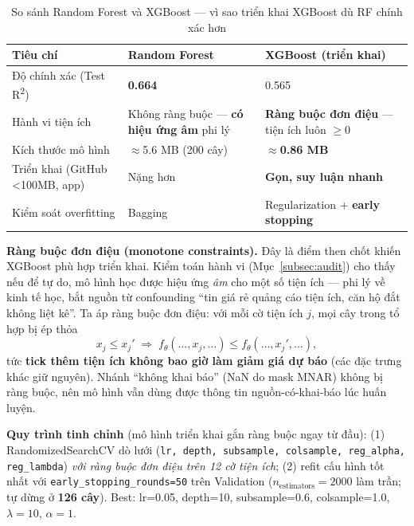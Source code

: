 \begin{table}[H]
  \centering
  \caption{So sánh Random Forest và XGBoost — vì sao triển khai XGBoost dù RF chính xác hơn}
  \label{tab:rf_vs_xgb}
  \begin{tabularx}{\textwidth}{@{}L{3.4cm} X X@{}}
    \toprule
    \textbf{Tiêu chí} & \textbf{Random Forest} & \textbf{XGBoost (triển khai)} \\
    \midrule
    Độ chính xác (Test R\textsuperscript{2}) & \textbf{0.664} & 0.565 \\
    Hành vi tiện ích & Không ràng buộc — \textbf{có hiệu ứng âm} phi lý &
      \textbf{Ràng buộc đơn điệu} — tiện ích luôn $\ge 0$ \\
    Kích thước mô hình & $\approx$5.6 MB (200 cây) & \textbf{$\approx$0.86 MB} \\
    Triển khai (GitHub <100MB, app) & Nặng hơn & \textbf{Gọn, suy luận nhanh} \\
    Kiểm soát overfitting & Bagging & Regularization + \textbf{early stopping} \\
    \bottomrule
  \end{tabularx}
\end{table}

\textbf{Ràng buộc đơn điệu (monotone constraints).} Đây là điểm then chốt khiến XGBoost phù hợp
triển khai. Kiểm toán hành vi (Mục~\ref{subsec:audit}) cho thấy nếu để tự do, mô hình học được
hiệu ứng \textit{âm} cho một số tiện ích — phi lý về kinh tế học, bắt nguồn từ confounding
``tin giá rẻ quảng cáo tiện ích, căn hộ đắt không liệt kê''. Ta áp ràng buộc đơn điệu: với mỗi
cờ tiện ích $j$, mọi cây trong tổ hợp bị ép thỏa
\[
  x_j \le x_j' \;\Rightarrow\; f_\theta(\ldots, x_j, \ldots) \le f_\theta(\ldots, x_j', \ldots),
\]
tức \textbf{tick thêm tiện ích không bao giờ làm giảm giá dự báo} (các đặc trưng khác giữ nguyên).
Nhánh ``không khai báo'' (NaN do mask MNAR) không bị ràng buộc, nên mô hình vẫn dùng được thông
tin nguồn-có-khai-báo lúc huấn luyện.

\textbf{Quy trình tinh chỉnh} (mô hình triển khai gắn ràng buộc ngay từ đầu):
(1) RandomizedSearchCV dò lưới (\texttt{lr, depth, subsample, colsample, reg\_alpha, reg\_lambda})
\textit{với ràng buộc đơn điệu trên 12 cờ tiện ích};
(2) refit cấu hình tốt nhất với \texttt{early\_stopping\_rounds=50} trên Validation
($n_\text{estimators}=2000$ làm trần; tự dừng ở \textbf{126 cây}).
Best: lr=0.05, depth=10, subsample=0.6, colsample=1.0, $\lambda=10$, $\alpha=1$.
